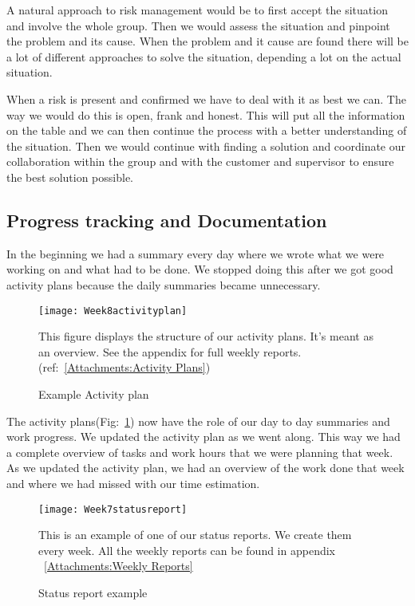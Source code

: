     A natural approach to risk management would be to first accept the situation and involve the whole group. Then we would assess the situation and pinpoint the problem and its cause. When the problem and it cause are found there will be a lot of different approaches to solve the situation, depending a lot on the actual situation. 
    
    When a risk is present and confirmed we have to deal with it as best we can. The way we would do this is open, frank and honest. This will put all the information on the table and we can then continue the process with a better understanding of the situation. Then we would continue with finding a solution and coordinate our collaboration within the group and with the customer and supervisor to ensure the best solution possible.

    \subsection{Progress tracking and Documentation}\label{Progress tracking and Documentation}
    In the beginning we had a summary every day where we wrote what we were working on and what had to be done. We stopped doing this after we got good activity plans because the daily summaries became unnecessary. 
    
    \begin{figure}[H]
        \centering
        \texttt{[image: Week8activityplan]}
        \caption{Example Activity plan}
        This figure displays the structure of our activity plans. It's meant as an overview. See the appendix for full weekly reports. 
        (ref:~\ref{Attachments:Activity Plans})
        \label{fig:Week8activityplan}
    \end{figure}
    
    The activity plans(Fig:~\ref{fig:Week8activityplan}) now have the role of our day to day summaries and work progress. We updated the activity plan as we went along. This way we had a complete overview of tasks and work hours that we were planning that week. As we updated the activity plan, we had an overview of the work done that week and where we had missed with our time estimation. 
    
    \begin{figure}[H]
        \centering
        \texttt{[image: Week7statusreport]}
        \caption{Status report example}
        This is an example of one of our status reports. We create them every week. All the weekly reports can be found in appendix ~\ref{Attachments:Weekly Reports}
        \label{fig:Week7statusreport}
    \end{figure}
    
